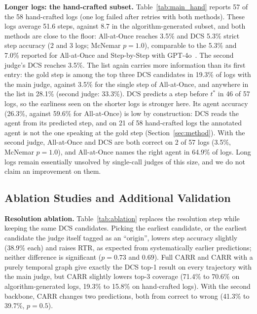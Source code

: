 \documentclass[conference]{IEEEtran}
\begin{document}
\textbf{Longer logs: the hand-crafted subset.} Table~\ref{tab:main_hand} reports 57 of the 58 hand-crafted logs (one log failed after retries with both methods). These logs average 51.6 steps, against 8.7 in the algorithm-generated subset, and both methods are close to the floor: All-at-Once reaches 3.5\% and DCS 5.3\% strict step accuracy (2 and 3 logs; McNemar $p=1.0$), comparable to the 5.3\% and 7.0\% reported for All-at-Once and Step-by-Step with GPT-4o~\cite{zhang2025whowhen}. The second judge's DCS reaches 3.5\%. The list again carries more information than its first entry: the gold step is among the top three DCS candidates in 19.3\% of logs with the main judge, against 3.5\% for the single step of All-at-Once, and anywhere in the list in 28.1\% (second judge: 33.3\%). DCS predicts a step before $t^*$ in 46 of 57 logs, so the earliness seen on the shorter logs is stronger here. Its agent accuracy (26.3\%, against 59.6\% for All-at-Once) is low by construction: DCS reads the agent from its predicted step, and on 21 of 58 hand-crafted logs the annotated agent is not the one speaking at the gold step (Section~\ref{sec:method}). With the second judge, All-at-Once and DCS are both correct on 2 of 57 logs (3.5\%, McNemar $p=1.0$), and All-at-Once names the right agent in 64.9\% of logs. Long logs remain essentially unsolved by single-call judges of this size, and we do not claim an improvement on them.


\subsection{Ablation Studies and Additional Validation}\label{sec:ablation}
\textbf{Resolution ablation.} Table~\ref{tab:ablation} replaces the resolution step while keeping the same DCS candidates. Picking the earliest candidate, or the earliest candidate the judge itself tagged as an ``origin'', lowers step accuracy slightly (38.9\% each) and raises RTR, as expected from systematically earlier predictions; neither difference is significant ($p=0.73$ and $0.69$). Full CARR and CARR with a purely temporal graph give exactly the DCS top-1 result on every trajectory with the main judge, but CARR slightly lowers top-3 coverage (71.4\% to 70.6\% on algorithm-generated logs, 19.3\% to 15.8\% on hand-crafted logs). With the second backbone, CARR changes two predictions, both from correct to wrong (41.3\% to 39.7\%, $p=0.5$).
\end{document}

